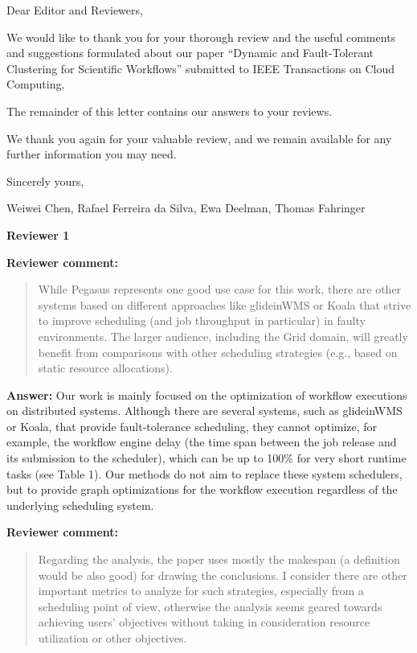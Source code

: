 \documentclass{letter}
\date{Feb 15, 2015}
\newenvironment{review}%
{\textbf{Reviewer comment:}\begin{quote}}%
{\end{quote}}%
\newcommand{\answer}[1]{%
      \textbf{Answer:} #1}
\newcommand{\revised}[1]{\emph{#1}\color{black}}
\begin{document}
\begin{letter}{}

\opening{Dear Editor and Reviewers,}

We would like to thank you for your thorough review and the useful
comments and suggestions formulated about our paper ``Dynamic and Fault-Tolerant Clustering for Scientific Workflows'' submitted to
IEEE Transactions on Cloud Computing.

The remainder of this letter contains our answers to your reviews. 

We thank you again for your valuable review, and we remain available for any further information you may need.

\vspace{0.5cm}

Sincerely yours,

\vspace{1cm}

Weiwei Chen, Rafael Ferreira da Silva, Ewa Deelman, Thomas Fahringer

\newpage

%
%
\textbf{Reviewer 1}

\begin{review}
While Pegasus represents one good use case for this work, there are other systems based on different approaches like glideinWMS or Koala that strive to improve scheduling (and job throughput in particular) in faulty environments. The larger audience, including the Grid domain, will greatly benefit from comparisons with other scheduling strategies (e.g., based on static resource allocations). 
\end{review}

\answer{Our work is mainly focused on the optimization of workflow executions on distributed systems. Although there are several systems, such as glideinWMS or Koala, that provide fault-tolerance scheduling, they cannot optimize, for example, the workflow engine delay (the time span between the job release and its submission to the scheduler), which can be up to 100\% for very short runtime tasks (see Table 1). Our methods do not aim to replace these system schedulers, but to provide graph optimizations for the workflow execution regardless of the underlying scheduling system.}

\revised{}



\begin{review}
Regarding the analysis, the paper uses mostly the makespan (a definition would be also good) for drawing the conclusions. I consider there are other important metrics to analyze for such strategies, especially from a scheduling point of view, otherwise the analysis seems geared towards achieving users' objectives without taking in consideration resource utilization or other objectives.
\end{review}


\end{letter}
\end{document}
